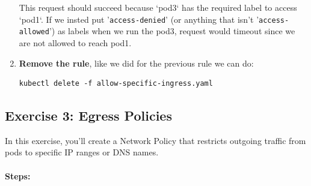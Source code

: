 \documentclass{article}
\begin{document}
\begin{enumerate}
    This request should succeed because `pod3` has the required label to access `pod1`. If we insted put '\texttt{access-denied}' (or anything that isn't '\texttt{access-allowed}') as labels when we run the pod3, request would timeout since we are not allowed to reach pod1.

    \item \textbf{Remove the rule}, like we did for the previous rule we can do:
    \begin{lstlisting}
kubectl delete -f allow-specific-ingress.yaml
    \end{lstlisting}
\end{enumerate}

\subsection{Exercise 3: Egress Policies}
In this exercise, you'll create a Network Policy that restricts outgoing traffic from pods to specific IP ranges or DNS names. \\
\\
\textbf{Steps:}
\end{document}
